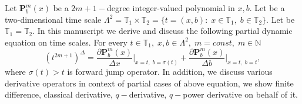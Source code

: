 Let $\mathbf{P}_b^m(x)$ be a $2m+1-$degree integer-valued polynomial in $x,b$.
Let be a two-dimensional time scale
$\Lambda^2 = \mathbb{T}_1 \times \mathbb{T}_2 = \{t=(x, b) \colon \; x\in\mathbb{T}_1, \; b\in\mathbb{T}_2 \}$.
Let be $\mathbb{T}_1 = \mathbb{T}_2$.
In this manuscript we derive and discuss the following partial dynamic equation on time scales.
For every $t\in\mathbb{T}_1, \; x,b\in \Lambda^2, \; m = const, \; m\in\mathbb{N}$
\[
    (t^{2m+1})^{\Delta} =
    \frac{\partial \mathbf{P}_b^m(x)}{\Delta x} \bigg |_{x = t, \; b = \sigma(t)}+
    \frac{\partial \mathbf{P}_b^m(x)}{\Delta b}\bigg |_{x = t, \; b = t},
\]
where $\sigma(t) > t$ is forward jump operator.
In addition, we discuss various derivative operators in context of partial cases of above equation,
we show finite difference, classical derivative, $q-$derivative, $q-$power derivative on behalf of it.